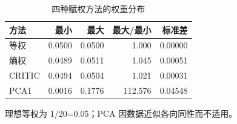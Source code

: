 \begin{table}[htbp]
\centering
\caption{四种赋权方法的权重分布}
\label{tab:weights}
\small
\begin{tabular}{lrrrr}
\toprule
方法 & 最小 & 最大 & 最大/最小 & 标准差 \\
\midrule
等权 & 0.0500 & 0.0500 & 1.000 & 0.00000 \\
熵权 & 0.0489 & 0.0511 & 1.045 & 0.00051 \\
CRITIC & 0.0494 & 0.0504 & 1.021 & 0.00031 \\
PCA1 & 0.0016 & 0.1776 & 112.576 & 0.04548 \\
\bottomrule
\end{tabular}
\par\vspace{2pt}\footnotesize 理想等权为 1/20=0.05；PCA 因数据近似各向同性而不适用。
\end{table}
